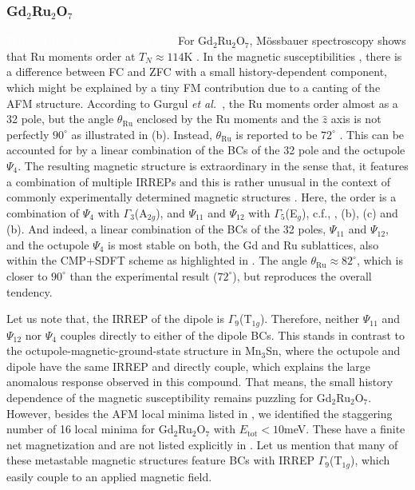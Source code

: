 \documentclass[10pt]{iopart}
\newcommand{\white}[1]{\textcolor{white}{#1}}
\begin{document}
\subsubsection{\texorpdfstring{Gd$_2$Ru$_2$O$_7$}{Gd2Ru2O7}} \white{Without this visibility is very low.}
\newline
For Gd$_2$Ru$_2$O$_7$, Mössbauer spectroscopy shows that Ru moments order at $T_N\approx114$K \cite{gurgul2007bulk}. In the magnetic susceptibilities \cite{gurgul2007bulk,yao2011hydrothermal}, there is a difference between FC and ZFC with a small history-dependent component, which might be explained by a tiny FM contribution due to a canting of the AFM structure. According to Gurgul \emph{et al.\ }\cite{gurgul2007bulk}, the Ru moments order almost as a 32 pole, but the angle $\theta_{\mathrm{Ru}}$ enclosed by the Ru moments and the $\hat{z}$ axis is not perfectly $90^{\circ}$ as illustrated in  (b). Instead, $\theta_{\mathrm{Ru}}$ is reported to be $72^{\circ}$ \cite{gurgul2007bulk}.
This can be accounted for by a linear combination of the BCs of the 32 pole and the octupole $\Psi_4$. The resulting magnetic structure is extraordinary in the sense that, it features a combination of multiple IRREPs and this is rather unusual in the context of commonly experimentally determined magnetic structures \cite{huebsch2021benchmark}. Here, the order is a combination of $\Psi_{4}$ with $\Gamma_3$(A$_{2g}$), and $\Psi_{11}$ and $\Psi_{12}$ with $\Gamma_5$(E$_g$), c.f., ,  (b), (c) and  (b). And indeed, a linear combination of the BCs of the 32 poles, $\Psi_{11}$ and $\Psi_{12}$, and the octupole $\Psi_4$ is most stable on both, the Gd and Ru sublattices, also within the CMP+SDFT scheme as highlighted in . The angle $\theta_{\mathrm{Ru}}\approx82^{\circ}$, which is closer to $90^{\circ}$ than the experimental result ($72^{\circ}$), but reproduces the overall tendency.

Let us note that, the IRREP of the dipole is $\Gamma_9$(T$_{1g}$). Therefore, neither $\Psi_{11}$ and $\Psi_{12}$ nor $\Psi_4$ couples directly to either of the dipole BCs. This stands in contrast to the octupole-magnetic-ground-state structure in Mn$_3$Sn, where the octupole and dipole have the same IRREP and directly couple, which explains the large anomalous response observed in this compound. That means, the small history dependence of the magnetic susceptibility remains puzzling for Gd$_2$Ru$_2$O$_7$. However, besides the AFM local minima listed in , we identified the staggering number of 16 local minima for Gd$_2$Ru$_2$O$_7$ with $E_{\mathrm{tot}} < 10$meV. These have a finite net magnetization and are not listed explicitly in . Let us mention that many of these metastable magnetic structures feature BCs with IRREP $\Gamma_9$(T$_{1g}$), which easily couple to an applied magnetic field. 
\end{document}
